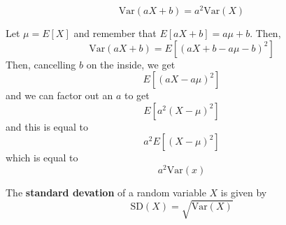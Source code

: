 \documentclass{article}
\begin{document}
\begin{proposition}
$$\text{Var}(aX + b) = a^2\text{Var}(X)$$
\end{proposition}

\begin{customproof}
Let $\mu = E[X]$ and remember that $E[aX+b] = a\mu + b$. Then, $$\text{Var}(aX+b) = E[(aX+b-a\mu - b)^2]$$Then, cancelling $b$ on the inside, we get$$E[(aX-a\mu)^2]$$and we can factor out an $a$ to get$$E[a^2(X-\mu)^2]$$and this is equal to $$a^2E[(X-\mu)^2]$$which is equal to$$a^2\text{Var}(x)$$
\end{customproof}

\begin{definition}
The \textbf{standard devation} of a random variable $X$ is given by $$\text{SD}(X) = \sqrt{\text{Var}(X)}$$ 
\end{definition}
\end{document}
